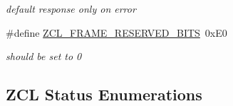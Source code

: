 \begin{DoxyCompactItemize}
\begin{DoxyCompactList}\small\item\em default response only on error \end{DoxyCompactList}\item 
\hypertarget{group__zcl_ga5a5d33260e614faaf630df493d0fea1f}{\#define \hyperlink{group__zcl_ga5a5d33260e614faaf630df493d0fea1f}{Z\-C\-L\-\_\-\-F\-R\-A\-M\-E\-\_\-\-R\-E\-S\-E\-R\-V\-E\-D\-\_\-\-B\-I\-T\-S}~0x\-E0}\label{group__zcl_ga5a5d33260e614faaf630df493d0fea1f}

\begin{DoxyCompactList}\small\item\em should be set to 0 \end{DoxyCompactList}\end{DoxyCompactItemize}
\subsection*{Z\-C\-L Status Enumerations}
\label{_amgrp0e2bca1e4595fbe46ba15a7bdc1e2591}%
